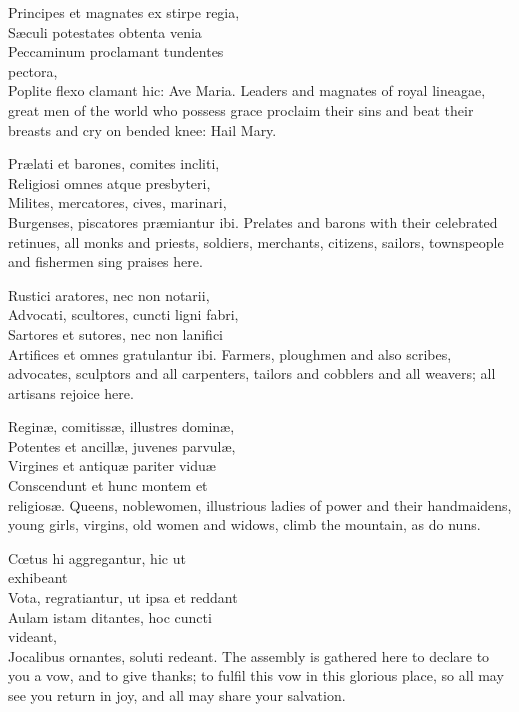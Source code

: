 \setlength{\englishwidth}{0.48\textwidth}
\setlength{\latinwidth}{0.53\textwidth}
\setlength{\interwidth}{7pt}
\setlength{\preverseskip}{2pt plus 1pt minus 1pt}

\renewcommand{\betweenLilyPondSystem}[1]{\par}


\vskip-5mm%
\hskip-5mm%
Principes et magnates ex stirpe regia,\\
Sæculi potestates obtenta venia\\
Peccaminum proclamant tundentes\\
\phantom{tab} pectora,\\
Poplite flexo clamant hic: Ave Maria.
\divverse
Leaders and magnates of royal
lineagae, great men of the world who
possess grace proclaim their sins and
beat their breasts and cry on bended
knee: Hail Mary.
\finishverse

\hskip-15mm%
Prælati et barones, comites incliti,\\
Religiosi omnes atque presbyteri,\\
Milites, mercatores, cives, marinari,\\
Burgenses, piscatores præmiantur ibi.
\divverse
Prelates and barons with their
celebrated retinues, all monks and
priests, soldiers, merchants, citizens,
sailors, townspeople and fishermen
sing praises here.
\finishverse

\hskip-10mm%
Rustici aratores, nec non notarii,\\
Advocati, scultores, cuncti ligni fabri,\\
Sartores et sutores, nec non lanifici\\
Artifices et omnes gratulantur ibi.
\divverse
Farmers, ploughmen and also
scribes, advocates, sculptors and all
carpenters, tailors and cobblers and all
weavers; all artisans rejoice here.
\finishverse

Reginæ, comitissæ, illustres dominæ,\\
Potentes et ancillæ, juvenes parvulæ,\\
Virgines et antiquæ pariter viduæ\\
Conscendunt et hunc montem et\\
\phantom{tab} religiosæ.
\divverse
Queens, noblewomen, illustrious ladies
of power and their handmaidens,
young girls, virgins, old women and
widows, climb the mountain, as do
nuns.
\finishverse

Cœtus hi aggregantur, hic ut\\
\phantom{tab} exhibeant\\
Vota, regratiantur, ut ipsa et reddant\\
Aulam istam ditantes, hoc cuncti\\
\phantom{tab} videant,\\
Jocalibus ornantes, soluti redeant.
\divverse
The assembly is gathered here to
declare to you a vow, and to give
thanks; to fulfil this vow in this
glorious place, so all may see you
return in joy, and all may share your
salvation.
\finishverse

